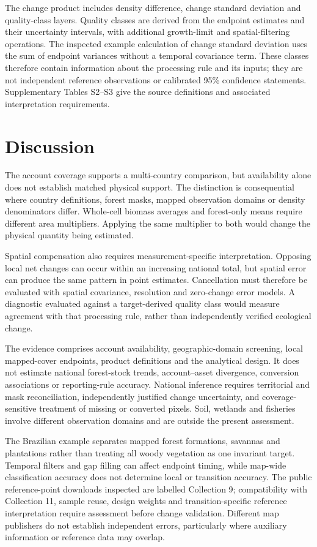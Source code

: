 \documentclass[11pt,a4paper]{article}
\begin{document}
The change product includes density difference, change standard deviation and quality-class layers. Quality classes are derived from the endpoint estimates and their uncertainty intervals, with additional growth-limit and spatial-filtering operations. The inspected example calculation of change standard deviation uses the sum of endpoint variances without a temporal covariance term. These classes therefore contain information about the processing rule and its inputs; they are not independent reference observations or calibrated 95\% confidence statements. Supplementary Tables S2--S3 give the source definitions and associated interpretation requirements.

\section{Discussion}
The account coverage supports a multi-country comparison, but availability alone does not establish matched physical support. The distinction is consequential where country definitions, forest masks, mapped observation domains or density denominators differ. Whole-cell biomass averages and forest-only means require different area multipliers. Applying the same multiplier to both would change the physical quantity being estimated.

Spatial compensation also requires measurement-specific interpretation. Opposing local net changes can occur within an increasing national total, but spatial error can produce the same pattern in point estimates. Cancellation must therefore be evaluated with spatial covariance, resolution and zero-change error models. A diagnostic evaluated against a target-derived quality class would measure agreement with that processing rule, rather than independently verified ecological change.

The evidence comprises account availability, geographic-domain screening, local mapped-cover endpoints, product definitions and the analytical design. It does not estimate national forest-stock trends, account--asset divergence, conversion associations or reporting-rule accuracy. National inference requires territorial and mask reconciliation, independently justified change uncertainty, and coverage-sensitive treatment of missing or converted pixels. Soil, wetlands and fisheries involve different observation domains and are outside the present assessment.

The Brazilian example separates mapped forest formations, savannas and plantations rather than treating all woody vegetation as one invariant target. Temporal filters and gap filling can affect endpoint timing, while map-wide classification accuracy does not determine local or transition accuracy. The public reference-point downloads inspected are labelled Collection 9; compatibility with Collection 11, sample reuse, design weights and transition-specific reference interpretation require assessment before change validation. Different map publishers do not establish independent errors, particularly where auxiliary information or reference data may overlap.
\end{document}
